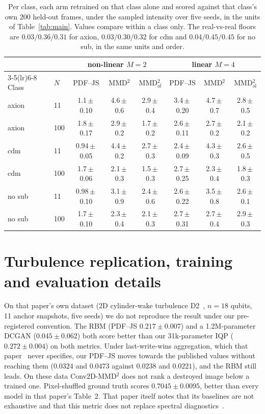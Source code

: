 \documentclass{article}
\begin{document}
\begin{table}[tb]
\centering
\caption{Per class, each arm retrained on that class alone and scored against that class's own $200$
held-out frames, under the sampled intensity over five seeds, in the units of
Table~\ref{tab:main}. Values compare within a class only. The real-vs-real floors are
$0.03 / 0.36 / 0.31$ for axion, $0.03 / 0.30 / 0.32$ for cdm and $0.04 / 0.45 / 0.45$ for no sub,
in the same units and order.}
\label{tab:perclass}
\scriptsize
\setlength{\tabcolsep}{3pt}
\begin{tabular}{llcccccc}
\toprule
& & \multicolumn{3}{c}{non-linear $M{=}2$} & \multicolumn{3}{c}{linear $M{=}4$} \\
\cmidrule(lr){3-5}\cmidrule(lr){6-8}
Class & $N$ & PDF--JS & MMD$^2$ & MMD$^2_{\mathrm{al}}$ & PDF--JS & MMD$^2$ & MMD$^2_{\mathrm{al}}$ \\
\midrule
axion  & 11  & 1.1\,$\pm$\,0.10 & 4.6\,$\pm$\,0.6 & 2.9\,$\pm$\,0.4 & 3.4\,$\pm$\,0.20 & 4.7\,$\pm$\,0.7 & 2.8\,$\pm$\,0.5 \\
axion  & 100 & 1.8\,$\pm$\,0.17 & 2.9\,$\pm$\,0.2 & 1.7\,$\pm$\,0.2 & 2.6\,$\pm$\,0.11 & 2.7\,$\pm$\,0.2 & 2.1\,$\pm$\,0.2 \\
cdm    & 11  & 0.94\,$\pm$\,0.05 & 4.4\,$\pm$\,0.2 & 2.7\,$\pm$\,0.3 & 2.4\,$\pm$\,0.09 & 4.3\,$\pm$\,0.3 & 2.6\,$\pm$\,0.5 \\
cdm    & 100 & 1.7\,$\pm$\,0.06 & 2.1\,$\pm$\,0.3 & 1.5\,$\pm$\,0.3 & 2.7\,$\pm$\,0.25 & 2.3\,$\pm$\,0.4 & 1.8\,$\pm$\,0.3 \\
no sub & 11  & 0.98\,$\pm$\,0.10 & 3.1\,$\pm$\,0.9 & 2.4\,$\pm$\,0.6 & 2.6\,$\pm$\,0.22 & 3.5\,$\pm$\,0.8 & 2.6\,$\pm$\,0.1 \\
no sub & 100 & 1.7\,$\pm$\,0.10 & 2.3\,$\pm$\,0.4 & 2.1\,$\pm$\,0.3 & 2.7\,$\pm$\,0.31 & 2.7\,$\pm$\,0.4 & 2.9\,$\pm$\,0.3 \\
\bottomrule
\end{tabular}
\end{table}

\section{Turbulence replication, training and evaluation details}
\label{app:turb}

On that paper's own dataset (2D cylinder-wake turbulence D2~\cite{khojasteh_2022_lagrangian},
$n=18$ qubits, 11 anchor snapshots, five seeds) we do not reproduce the result under our
pre-registered convention. The RBM (PDF--JS $0.217 \pm 0.007$) and a 1.2M-parameter DCGAN
($0.045 \pm 0.062$) both score better than our 31k-parameter IQP ($0.272 \pm 0.004$) on both
metrics. Under last-write-wins aggregation, which that paper~\cite{liu_2026_correlation} never
specifies, our PDF--JS moves towards the published values without reaching them ($0.0324$ and
$0.0473$ against $0.0238$ and $0.0221$), and the RBM still leads. On these data Conv2D-MMD$^2$ does
not rank a destroyed image below a trained one. Pixel-shuffled ground truth scores
$0.7045 \pm 0.0095$, better than every model in that paper's Table~2. That paper itself notes that
its baselines are not exhaustive and that this metric does not replace spectral
diagnostics~\cite{liu_2026_correlation}.
\end{document}
